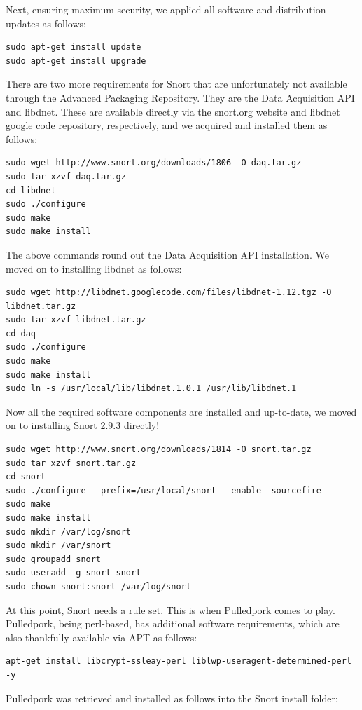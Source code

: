 \documentclass[12pt,letterpaper,titlepage]{report}
\begin{document}
{Next, ensuring maximum security, we applied all software and distribution
updates as follows:
\begin{verbatim}
sudo apt-get install update 
sudo apt-get install upgrade
\end{verbatim}
There are two more requirements for Snort that are unfortunately not available
through the Advanced Packaging Repository.  They are the Data Acquisition API
and libdnet.  These are available directly via the snort.org website and libdnet
google code repository, respectively, and we acquired and installed them as
follows: 
\begin{verbatim}
sudo wget http://www.snort.org/downloads/1806 -O daq.tar.gz 
sudo tar xzvf daq.tar.gz 
cd libdnet 
sudo ./configure 
sudo make 
sudo make install
\end{verbatim}
The above commands round out the Data Acquisition API installation. We moved on
to installing libdnet as follows: 
\begin{verbatim}
sudo wget http://libdnet.googlecode.com/files/libdnet-1.12.tgz -O libdnet.tar.gz 
sudo tar xzvf libdnet.tar.gz 
cd daq 
sudo ./configure 
sudo make 
sudo make install     
sudo ln -s /usr/local/lib/libdnet.1.0.1 /usr/lib/libdnet.1
\end{verbatim}
Now all the required software components are installed and up-to-date, we moved
on to installing Snort 2.9.3 directly!
\begin{verbatim}
sudo wget http://www.snort.org/downloads/1814 -O snort.tar.gz 
sudo tar xzvf snort.tar.gz 
cd snort 
sudo ./configure --prefix=/usr/local/snort --enable- sourcefire 
sudo make 
sudo make install 
sudo mkdir /var/log/snort    
sudo mkdir /var/snort 
sudo groupadd snort 
sudo useradd -g snort snort 
sudo chown snort:snort /var/log/snort
\end{verbatim}
At this point, Snort needs a rule set. This is when Pulledpork comes to play.
Pulledpork, being perl-based, has additional software requirements, which are
also thankfully available via APT as follows: 
\begin{verbatim}
apt-get install libcrypt-ssleay-perl liblwp-useragent-determined-perl -y
\end{verbatim}
Pulledpork was retrieved and installed as follows into the Snort install folder:
}
\end{document}
